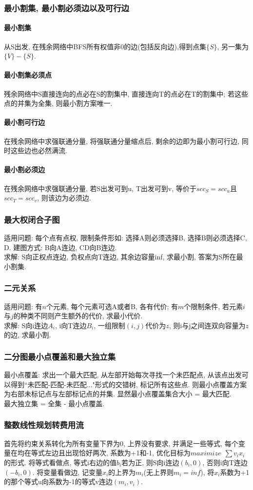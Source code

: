 \subsubsection{最小割集, 最小割必须边以及可行边}
\noindent

\paragraph{最小割集} 从S出发, 在残余网络中BFS所有权值非0的边(包括反向边),得到点集$\{S\}$, 另一集为$\{V\} - \{S\}$.
\paragraph{最小割集必须点} 残余网络中S直接连向的点必在S的割集中, 直接连向T的点必在T的割集中; 若这些点的并集为全集, 则最小割方案唯一.
\paragraph{最小割可行边} 在残余网络中求强联通分量, 将强联通分量缩点后, 剩余的边即为最小割可行边, 同时这些边也必然满流.
\paragraph{最小割必须边} 在残余网络中求强联通分量, 若S出发可到u, T出发可到v, 等价于$scc_S=scc_u$且$scc_T = scc_v$, 则该边为必须边.

\subsubsection{最大权闭合子图}
\noindent
适用问题: 每个点有点权, 限制条件形如: 选择A则必须选择B, 选择B则必须选择C, D. 建图方式: B向A连边, CD向B连边.\\
求解: S向正权点连边, 负权点向T连边, 其余边容量inf, 求最小割, 答案为S所在最小割集.

\subsubsection{二元关系}
\noinent
适用问题: 有$n$个元素, 每个元素可选A或者B, 各有代价; 有$m$个限制条件, 若元素$i$与$j$的种类不同则产生额外的代价, 求最小代价.\\
求解: S向i连边$A_i$, i向T连边$B_i$, 一组限制$(i,j)$代价为$z$, 则i与j之间连双向容量为$z$的边, 求最小割.

\subsubsection{二分图最小点覆盖和最大独立集}
\noindent
最小点覆盖: 求出一个最大匹配, 从左部开始每次寻找一个未匹配点, 从该点出发可以得到``未匹配-匹配-未匹配..."形式的交错树, 标记所有这些点. 则最小点覆盖方案为右部未标记点与左部标记点的并集. 显然最小点覆盖集合大小 = 最大匹配.\\
最大独立集 = 全集 - 最小点覆盖.

\subsubsection{整数线性规划转费用流}
\noindent
首先将约束关系转化为所有变量下界为0, 上界没有要求, 并满足一些等式, 每个变量在均在等式左边且出现恰好两次, 系数为+1和-1, 优化目标为$maximize\ \ \sum v_ix_i$的形式. 将等式看做点, 等式i右边的值$b_i$若为正, 则S向i连边$(b_i, 0)$, 否则i向T连边$(-b_i, 0)$. 将变量看做边, 记变量$x_i$的上界为$m_i$(无上界则$m_i=inf$), 将$x_i$系数为+1的那个等式u向系数为-1的等式v连边$(m_i, v_i)$.